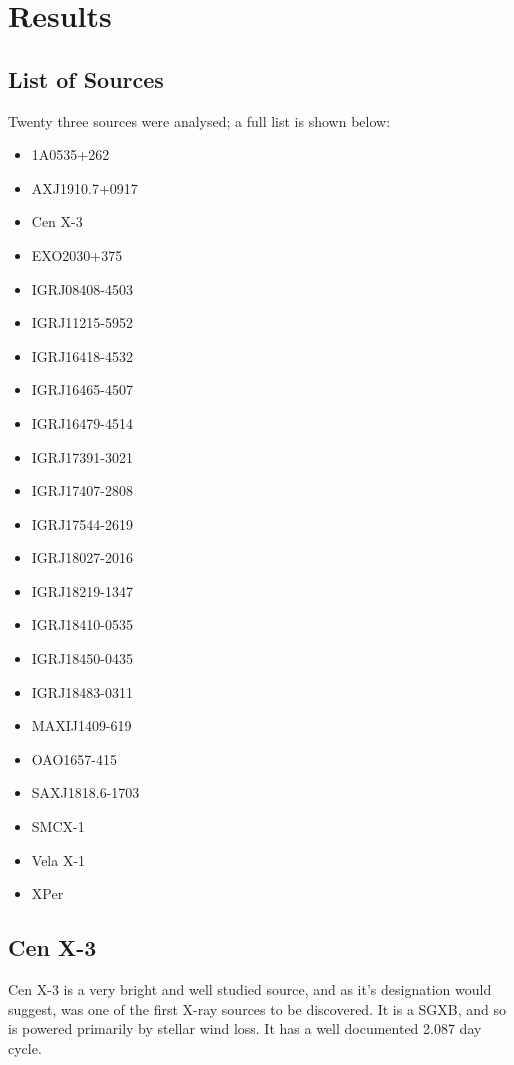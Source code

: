 
\chapter{Results} %

\label{ch:results} %

\section{List of Sources}
Twenty three sources were analysed; a full list is shown below:
\begin{itemize}
\item 1A0535+262
\item AXJ1910.7+0917
\item Cen X-3
\item EXO2030+375
\item IGRJ08408-4503
\item IGRJ11215-5952
\item IGRJ16418-4532
\item IGRJ16465-4507
\item IGRJ16479-4514
\item IGRJ17391-3021
\item IGRJ17407-2808
\item IGRJ17544-2619
\item IGRJ18027-2016
\item IGRJ18219-1347
\item IGRJ18410-0535
\item IGRJ18450-0435
\item IGRJ18483-0311
\item MAXIJ1409-619
\item OAO1657-415
\item SAXJ1818.6-1703
\item SMCX-1
\item Vela X-1
\item XPer
\end{itemize}
\clearpage{}

\section{Cen X-3}
Cen X-3 is a very bright and well studied source, and as it\textquoteright{}s designation would suggest, was one of the first X-ray sources to be discovered. It is a SGXB, and so is powered primarily by stellar wind loss. It has a well documented 2.087 day cycle.

